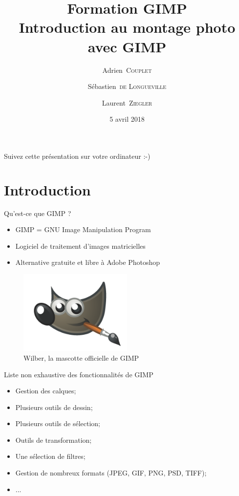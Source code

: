 \documentclass[10pt,svgnames,usenames,table]{beamer}
\institute{Louvain-li-Nux}
\title{\textbf{Formation GIMP}\\
Introduction au montage photo avec GIMP}
\author{Adrien~\textsc{Couplet} \and Sébastien~\textsc{de Longueville} \and Laurent~\textsc{Ziegler}}
\date{5 avril 2018}
\begin{document}
\begin{frame}
	\maketitle
\end{frame}

\begin{frame}
  \begin{center}\Large
  Suivez cette présentation sur votre ordinateur :-)
  
  \vspace{1cm}
  \end{center}
\end{frame}

\section{Introduction}
\begin{frame}[allowframebreaks]{Qu'est-ce que GIMP ?}
    \begin{itemize}
        \item GIMP = GNU Image Manipulation Program
        \item Logiciel de traitement d'images matricielles
        \item Alternative gratuite et libre à Adobe Photoshop
    \end{itemize}
    \begin{figure}
        \centering
        \includegraphics[width=0.5\textwidth]{Images/gimp-logo}
        \caption{Wilber, la mascotte officielle de GIMP} 
    \end{figure}
    \framebreak
    Liste non exhaustive des fonctionnalités de GIMP
    \begin{itemize}
        \item Gestion des calques;
        \item Plusieurs outils de dessin;
        \item Plusieurs outils de sélection;
        \item Outils de transformation;
        \item Une sélection de filtres;
        \item Gestion de nombreux formats (JPEG, GIF, PNG, PSD, TIFF);
        \item ...
    \end{itemize}
\end{frame}
\end{document}
